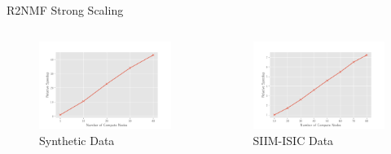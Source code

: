 \documentclass{beamer}
\newcommand{\image}{SIIM-ISIC}
\begin{document}
\begin{frame}{R2NMF Strong Scaling}
    \centering
    \begin{columns}
        \begin{column}{0.5\textwidth}
            \begin{figure}
            \includegraphics[width=\textwidth]{../plots/synthetic_rank2_speedup.pdf}
            \caption{Synthetic  Data}
            \end{figure}
        \end{column}
        \begin{column}{0.5\textwidth}
            \begin{figure}
            \includegraphics[width=\textwidth]{../plots/realworld_rank2_speedup.pdf}
            \caption{\image{} Data}
            \end{figure}
        \end{column}
    \end{columns}
\end{frame}
\end{document}
